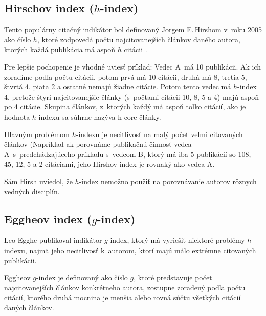 \subsection{Hirschov index ($h$-index)}
\label{sec:h-index}

Tento populárny citačný indikátor bol definovaný Jorgem E.\,Hirshom v~roku 2005
ako číslo $h$, ktoré zodpovedá počtu najcitovanejších článkov daného autora,
ktorých každá publikácia má aspoň $h$ citácii \citep{Hirsch2005}.

Pre lepšie pochopenie je vhodné uviesť príklad: Vedec A~má 10 publikácii.  Ak
ich zoradíme podľa počtu citácii, potom prvá má 10 citácii, druhá má 8, tretia
5, štvrtá 4, piata 2 a ostatné nemajú žiadne citácie.  Potom tento vedec má
$h$-index 4, pretože štyri najcitovanejšie články (s~počtami citácii 10, 8, 5 a
4) majú aspoň po 4 citácie. Skupina článkov, z~ktorých každý má aspoň toľko citácií,
ako je hodnota $h$-indexu sa súhrne nazýva h-core články.

Hlavným problémom $h$-indexu je necitlivosť na malý počet veľmi citovaných článkov
(Napríklad ak porovnáme publikačnú činnosť vedca A~s~predchádzajúceho príkladu
s~vedcom B, ktorý má iba 5 publikácií so 108, 45, 12, 5 a 2 citáciami, jeho
Hirshov index je rovnaký ako vedca A.

Sám Hirsh uviedol, že $h$-index nemožno použiť na porovnávanie autorov rôznych
vedných disciplín.


\subsection{Eggheov index ($g$-index)}
\label{sec:g-index}

Leo Egghe \citeyearpar{Egghe2006} publikoval indikátor $g$-index, ktorý má vyriešiť niektoré
problémy $h$-indexu, najmä jeho necitlivosť k~autorom, ktorí majú málo extrémne
citovaných publikácii.

Eggheov $g$-index je definovaný ako číslo $g$, ktoré predstavuje počet
najcitovanejších článkov konkrétneho autora, zostupne zoradený podľa počtu
citácií, ktorého druhá mocnina je menšia alebo rovná súčtu všetkých citácií
daných článkov.


